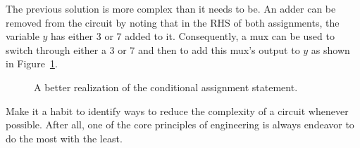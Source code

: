 The previous solution is more complex than it needs to be. An adder
can be removed from the circuit by noting that in the RHS of both
assignments, the variable $y$ has either 3 or 7 added to it.
Consequently, a mux can be used to switch through either a 3 or
7 and then to add this mux's output to $y$ as shown in
Figure~\ref{fig:comboBBcond2}.

\begin{figure}[ht]
    \caption{A better realization of the conditional assignment statement.}
    \label{fig:comboBBcond2}
\end{figure}

Make it a habit to identify ways to reduce the complexity
of a circuit whenever possible.  After all, one of the core
principles of engineering is always endeavor to do the most with
the least.
